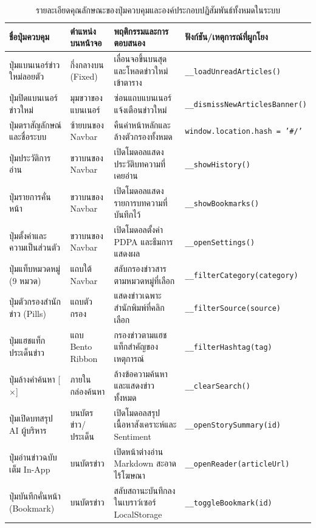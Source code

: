 \begin{table}[H]
\centering
\small
\caption{รายละเอียดคุณลักษณะของปุ่มควบคุมและองค์ประกอบปฏิสัมพันธ์ทั้งหมดในระบบ}
\label{tab:all_ui_buttons}
\begin{tabular}{|p{3.2cm}|p{2.6cm}|p{4.2cm}|p{3.8cm}|}
\hline
\textbf{ชื่อปุ่มควบคุม} & \textbf{ตำแหน่งบนหน้าจอ} & \textbf{พฤติกรรมและการตอบสนอง} & \textbf{ฟังก์ชัน/เหตุการณ์ที่ผูกโยง} \\
\hline
ปุ่มแบนเนอร์ข่าวใหม่ลอยตัว & กึ่งกลางบน (Fixed) & เลื่อนจอขึ้นบนสุดและโหลดข่าวใหม่เข้าตาราง & \texttt{\_\_loadUnreadArticles()} \\ \hline
ปุ่มปิดแบนเนอร์ข่าวใหม่ & มุมขวาของแบนเนอร์ & ซ่อนแถบแบนเนอร์แจ้งเตือนข่าวใหม่ & \texttt{\_\_dismissNewArticlesBanner()} \\ \hline
ปุ่มตราสัญลักษณ์และชื่อระบบ & ซ้ายบนของ Navbar & คืนค่าหน้าหลักและล้างตัวกรองทั้งหมด & \texttt{window.location.hash = '\#/'} \\ \hline
ปุ่มประวัติการอ่าน & ขวาบนของ Navbar & เปิดโมดอลแสดงประวัติบทความที่เคยอ่าน & \texttt{\_\_showHistory()} \\ \hline
ปุ่มรายการคั่นหน้า & ขวาบนของ Navbar & เปิดโมดอลแสดงรายการบทความที่บันทึกไว้ & \texttt{\_\_showBookmarks()} \\ \hline
ปุ่มตั้งค่าและความเป็นส่วนตัว & ขวาบนของ Navbar & เปิดโมดอลตั้งค่า PDPA และธีมการแสดงผล & \texttt{\_\_openSettings()} \\ \hline
ปุ่มแท็บหมวดหมู่ (9 หมวด) & แถบใต้ Navbar & สลับกรองข่าวสารตามหมวดหมู่ที่เลือก & \texttt{\_\_filterCategory(category)} \\ \hline
ปุ่มตัวกรองสำนักข่าว (Pills) & แถบตัวกรอง & แสดงข่าวเฉพาะสำนักพิมพ์ที่คลิกเลือก & \texttt{\_\_filterSource(source)} \\ \hline
ปุ่มแฮชแท็กประเด็นข่าว & แถบ Bento Ribbon & กรองข่าวตามแฮชแท็กสำคัญของเหตุการณ์ & \texttt{\_\_filterHashtag(tag)} \\ \hline
ปุ่มล้างคำค้นหา [$\times$] & ภายในกล่องค้นหา & ล้างข้อความค้นหาและแสดงข่าวทั้งหมด & \texttt{\_\_clearSearch()} \\ \hline
ปุ่มเปิดบทสรุป AI ผู้บริหาร & บนบัตรข่าว/ประเด็น & เปิดโมดอลสรุปเนื้อหาสังเคราะห์และ Sentiment & \texttt{\_\_openStorySummary(id)} \\ \hline
ปุ่มอ่านข่าวฉบับเต็ม In-App & บนบัตรข่าว & เปิดหน้าต่างอ่าน Markdown สะอาด ไร้โฆษณา & \texttt{\_\_openReader(articleUrl)} \\ \hline
ปุ่มบันทึกคั่นหน้า (Bookmark) & บนบัตรข่าว & สลับสถานะบันทึกลงในเบราว์เซอร์ LocalStorage & \texttt{\_\_toggleBookmark(id)} \\ \hline

\end{tabular}
\end{table}
